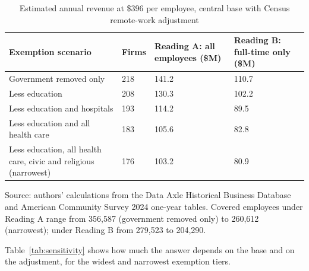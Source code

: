 \documentclass[12pt,letterpaper]{article}
\begin{document}
\begin{table}[H]
\centering
\caption{Estimated annual revenue at \$396 per employee, central base with Census remote-work adjustment}
\label{tab:revenue}
\small
\begin{tabular}{@{}L{2.5in}ZZZ@{}}
\toprule
\textbf{Exemption scenario} & \textbf{Firms} & \textbf{Reading A: all employees (\$M)} & \textbf{Reading B: full-time only (\$M)} \\
\midrule
Government removed only & 218 & 141.2 & 110.7 \\
Less education & 208 & 130.3 & 102.2 \\
Less education and hospitals & 193 & 114.2 & 89.5 \\
Less education and all health care & 183 & 105.6 & 82.8 \\
Less education, all health care, civic and religious (narrowest) & 176 & 103.2 & 80.9 \\
\bottomrule
\end{tabular}

\vspace{2pt}
{\footnotesize Source: authors' calculations from the Data Axle Historical Business Database and American Community Survey 2024 one-year tables. Covered employees under Reading A range from 356,587 (government removed only) to 260,612 (narrowest); under Reading B from 279,523 to 204,290.}
\end{table}

Table~\ref{tab:sensitivity} shows how much the answer depends on the base and on the adjustment, for the widest and narrowest exemption tiers.
\end{document}
